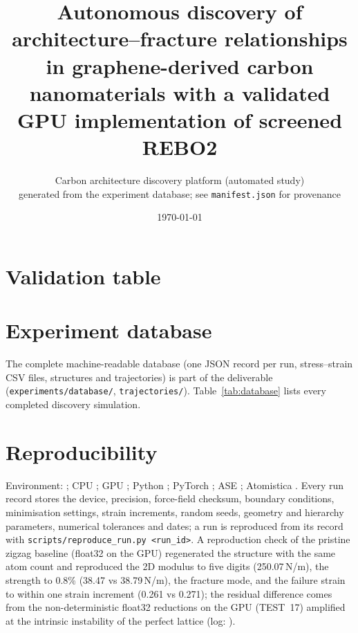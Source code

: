 

\title{Autonomous discovery of architecture--fracture relationships in graphene-derived carbon nanomaterials with a validated GPU implementation of screened REBO2}
\author{Carbon architecture discovery platform (automated study)\\ \small generated from the experiment database; see \texttt{manifest.json} for provenance}
\date{\today}

\maketitle
\begin{abstract}

\end{abstract}
\tableofcontents



\appendix
\section{Validation table}

\section{Experiment database}
\label{app:database}
The complete machine-readable database (one JSON record per run, stress--strain CSV files, structures and trajectories) is part of the deliverable (\texttt{experiments/database/}, \texttt{trajectories/}). Table~\ref{tab:database} lists every completed discovery simulation.

\section{Reproducibility}
\label{app:repro}
Environment: \envOS; CPU \envCPU; GPU \envGPU; Python \envPython; PyTorch \envTorch; ASE \envASE; Atomistica \envAtomistica. Every run record stores the device, precision, force-field checksum, boundary conditions, minimisation settings, strain increments, random seeds, geometry and hierarchy parameters, numerical tolerances and dates; a run is reproduced from its record with \texttt{scripts/reproduce\_run.py <run\_id>}. A reproduction check of the pristine zigzag baseline (float32 on the GPU) regenerated the structure with the same atom count and reproduced the 2D modulus to five digits (250.07\,N/m), the strength to 0.8\% (38.47 vs 38.79\,N/m), the fracture mode, and the failure strain to within one strain increment (0.261 vs 0.271); the residual difference comes from the non-deterministic float32 reductions on the GPU (TEST~17) amplified at the intrinsic instability of the perfect lattice (log: ).



